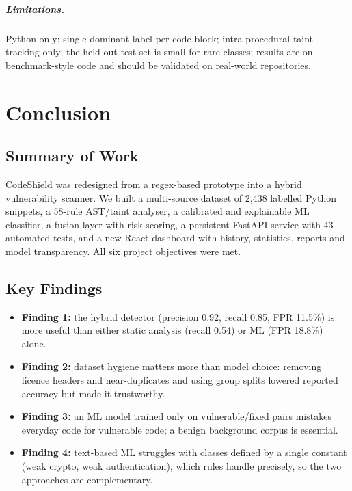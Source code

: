 \documentclass[11pt,a4paper,twoside]{report}
\begin{document}
\paragraph{Limitations.} Python only; single dominant label per code block; intra-procedural taint tracking only; the held-out test set is small for rare classes; results are on benchmark-style code and should be validated on real-world repositories.

\chapter{Conclusion}

\section{Summary of Work}
CodeShield was redesigned from a regex-based prototype into a hybrid vulnerability scanner. We built a multi-source dataset of 2{,}438 labelled Python snippets, a 58-rule AST/taint analyser, a calibrated and explainable ML classifier, a fusion layer with risk scoring, a persistent FastAPI service with 43 automated tests, and a new React dashboard with history, statistics, reports and model transparency. All six project objectives were met.

\section{Key Findings}
\begin{itemize}[noitemsep]
  \item \textbf{Finding 1:} the hybrid detector (precision 0.92, recall 0.85, FPR 11.5\%) is more useful than either static analysis (recall 0.54) or ML (FPR 18.8\%) alone.
  \item \textbf{Finding 2:} dataset hygiene matters more than model choice: removing licence headers and near-duplicates and using group splits lowered reported accuracy but made it trustworthy.
  \item \textbf{Finding 3:} an ML model trained only on vulnerable/fixed pairs mistakes everyday code for vulnerable code; a benign background corpus is essential.
  \item \textbf{Finding 4:} text-based ML struggles with classes defined by a single constant (weak crypto, weak authentication), which rules handle precisely, so the two approaches are complementary.
\end{itemize}
\end{document}
